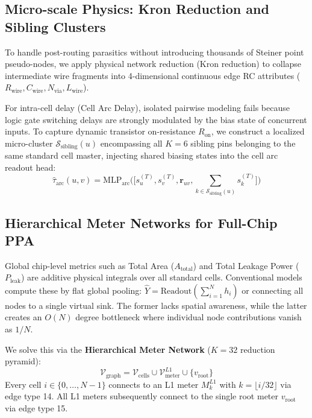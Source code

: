 \documentclass[conference]{IEEEtran}
\begin{document}
\subsection{Micro-scale Physics: Kron Reduction and Sibling Clusters}
To handle post-routing parasitics without introducing thousands of Steiner point pseudo-nodes, we apply physical network reduction (Kron reduction) to collapse intermediate wire fragments into 4-dimensional continuous edge RC attributes ($R_{\text{wire}}, C_{\text{wire}}, N_{\text{via}}, L_{\text{wire}}$).

For intra-cell delay (Cell Arc Delay), isolated pairwise modeling fails because logic gate switching delays are strongly modulated by the bias state of concurrent inputs. To capture dynamic transistor on-resistance $R_{\text{on}}$, we construct a localized micro-cluster $\mathcal{S}_{\text{sibling}}(u)$ encompassing all $K=6$ sibling pins belonging to the same standard cell master, injecting shared biasing states into the cell arc readout head:
\begin{equation}
\widehat{\tau}_{\text{arc}}(u, v) = \text{MLP}_{\text{arc}}\Big( \big[ s_u^{(T)}, s_v^{(T)}, \mathbf{r}_{uv}, \sum_{k \in \mathcal{S}_{\text{sibling}}(u)} s_k^{(T)} \big] \Big)
\end{equation}

\subsection{Hierarchical Meter Networks for Full-Chip PPA}
Global chip-level metrics such as Total Area ($A_{\text{total}}$) and Total Leakage Power ($P_{\text{leak}}$) are additive physical integrals over all standard cells. Conventional models compute these by flat global pooling: $\widehat{Y} = \text{Readout}(\sum_{i=1}^N h_i)$ or connecting all nodes to a single virtual sink. The former lacks spatial awareness, while the latter creates an $O(N)$ degree bottleneck where individual node contributions vanish as $1/N$.

We solve this via the \textbf{Hierarchical Meter Network} ($K=32$ reduction pyramid):
\begin{equation}
\mathcal{V}_{\text{graph}} = \mathcal{V}_{\text{cells}} \cup \mathcal{V}_{\text{meter}}^{L1} \cup \{v_{\text{root}}\}
\end{equation}
Every cell $i \in \{0, \dots, N-1\}$ connects to an L1 meter $M_k^{L1}$ with $k = \lfloor i / 32 \rfloor$ via edge type 14. All L1 meters subsequently connect to the single root meter $v_{\text{root}}$ via edge type 15.
\end{document}
